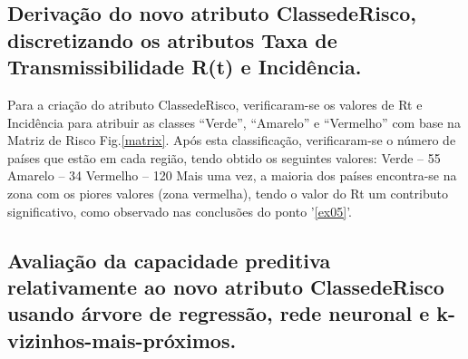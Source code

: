 \documentclass[conference]{IEEEtran}
\begin{document}
\subsection{Derivação do novo atributo ClassedeRisco, discretizando os atributos Taxa de Transmissibilidade R(t) e Incidência.}
Para a criação do atributo ClassedeRisco, verificaram-se os valores de Rt e Incidência para atribuir as classes “Verde”, “Amarelo” e “Vermelho” com base na Matriz de Risco Fig.\ref{matrix}.
Após esta classificação, verificaram-se o número de países que estão em cada região, tendo obtido os seguintes valores:
Verde – 55
Amarelo – 34
Vermelho – 120
Mais uma vez, a maioria dos países encontra-se na zona com os piores valores (zona vermelha), tendo o valor do Rt um contributo significativo, como observado nas conclusões do ponto '\ref{ex05}'.



\subsection{Avaliação da capacidade preditiva relativamente ao novo atributo ClassedeRisco usando árvore de regressão, rede neuronal e k-vizinhos-mais-próximos.}
\end{document}
